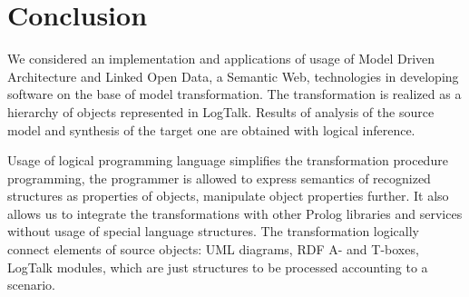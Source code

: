 \documentclass[runningheads]{llncs}
\begin{document}



\section{Conclusion}

We considered an implementation and applications of usage of Model Driven Architecture and Linked Open Data, a Semantic Web, technologies in developing software \cite{SWEB} on the base of model transformation.  The transformation is realized as a hierarchy of objects represented in LogTalk.  Results of analysis of the source model and synthesis of the target one are obtained with logical inference.

Usage of logical programming language simplifies the transformation procedure programming, the programmer is allowed to express semantics of recognized structures as properties of objects, manipulate object properties further. It also allows us to integrate the transformations with other Prolog libraries and services without usage of special language structures. The transformation logically connect elements of source objects: UML diagrams, RDF A- and T-boxes, LogTalk modules, which are just structures to be processed accounting to a scenario.
\end{document}
